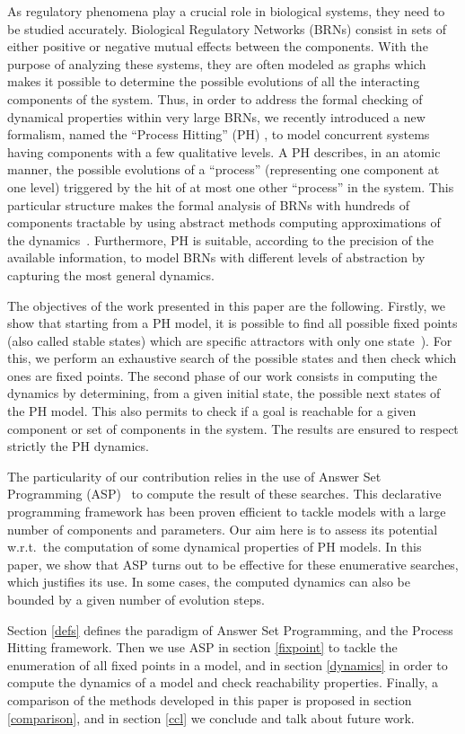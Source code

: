 As regulatory phenomena play a crucial role in biological systems, they need to
be studied accurately. Biological Regulatory Networks (BRNs) consist in sets
of either positive or negative mutual effects between the components. With the
purpose of analyzing these systems, they are often modeled as graphs which makes
it possible to determine the possible evolutions of all the interacting components of the system. Thus, in order to address the formal checking of dynamical properties within very large BRNs, we recently introduced a new formalism, named the “Process Hitting” (PH) \cite{PMR10-TCSB}, to model concurrent systems having components with a few qualitative levels. A PH describes, in an atomic manner, the possible evolutions of a “process” (representing one component at one level) triggered by the hit of at most one other “process” in the system. This particular structure makes the formal analysis of BRNs with hundreds of components tractable by using abstract methods computing approximations of the dynamics~\cite{PMR12-MSCS}. Furthermore, PH is suitable, according to the precision of the available information, to model BRNs with different levels of abstraction by capturing the most general dynamics.

The objectives of the work presented in this paper are the following.
Firstly, we show that starting from a PH model, it is possible to find all possible
fixed points (also called stable states)
which are specific attractors with only one state~\cite{wuensche1998genomic}).
For this, we perform an exhaustive search of the possible states and then check which ones are fixed points.
The second phase of our work consists in computing the dynamics by determining, from a given initial state, the possible next states of the PH model.
This also permits to check if a goal is reachable for a given component or set of components in the system.
The results are ensured to respect strictly the PH dynamics.

The particularity of our contribution relies in the use of Answer Set Programming
(ASP)~\cite{baral2003knowledge}
to compute the result of these searches.
This declarative programming framework has been proven efficient
to tackle models with a large number of components and parameters.
Our aim here is to assess its potential w.r.t.\ the computation
of some dynamical properties of PH models.
In this paper, we show that ASP turns out to be effective
for these enumerative searches, which justifies its use.
In some cases, the computed dynamics can also be bounded by a given
number of evolution steps.

Section \ref{defs} defines the paradigm of Answer Set Programming,
and the Process Hitting framework.
Then we use ASP in section \ref{fixpoint} to tackle the enumeration
of all fixed points in a model,
and in section \ref{dynamics} in order to compute the dynamics of a model
and check reachability properties.
Finally, a comparison of the methods developed in this paper is
proposed in section \ref{comparison},
and in section \ref{ccl} we conclude and talk about future work.

